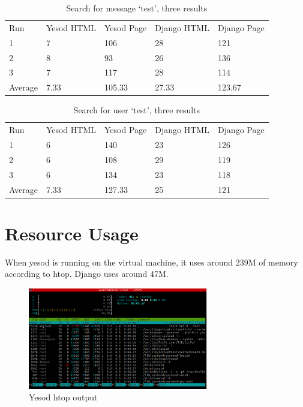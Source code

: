 \begin{table}[H]
    \caption{Search for message `test', three results}
    \begin{center}
        \begin{tabular}{ | l | l | l | l | l |}
            \hline
            Run & Yesod HTML & Yesod Page & Django HTML & Django Page \\
            1 & 7 & 106 & 28 & 121 \\
            2 & 8 & 93 & 26 & 136 \\
            3 & 7 & 117 & 28 & 114 \\
            Average & 7.33 &  105.33 & 27.33 & 123.67 \\
            \hline
        \end{tabular}
    \end{center}
    \label{tab:searchMessageLoadSpeeds}
\end{table}

\begin{table}[H]
    \caption{Search for user `test', three results}
    \begin{center}
        \begin{tabular}{ | l | l | l | l | l |}
            \hline
            Run & Yesod HTML & Yesod Page & Django HTML & Django Page \\
            1 & 6 & 140 & 23 & 126 \\
            2 & 6 & 108 & 29 & 119 \\
            3 & 6 & 134 & 23 & 118 \\
            Average & 7.33 & 127.33 & 25 & 121 \\
            \hline
        \end{tabular}
    \end{center}
    \label{tab:searchUserLoadSpeeds}
\end{table}

\section{Resource Usage}

When yesod is running on the virtual machine, it uses around 239M of
memory according to htop. Django uses around 47M.

\begin{figure}[H]
    \centering
    \includegraphics[width=0.7\textwidth]{final_report/pics/yesodIdle.png}
    \caption{Yesod htop output}
    \label{fig:yesodHtop}
\end{figure}


